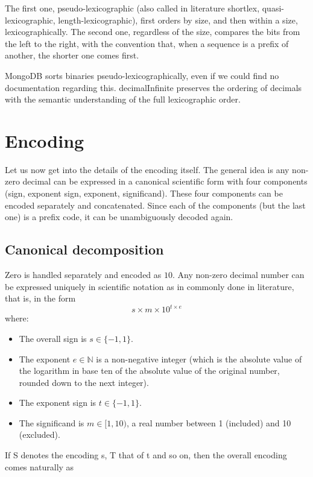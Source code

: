 \documentclass[final,leqno,onefignum,onetabnum]{siamltex1213}
\begin{document}
The first one, pseudo-lexicographic (also called in literature shortlex, quasi-lexicographic, length-lexicographic), first orders by size, and then within a size, lexicographically. The second one, regardless of the size, compares the bits from the left to the right, with the convention that, when a sequence is a prefix of another, the shorter one comes first.




MongoDB sorts binaries pseudo-lexicographically, even if we could find no documentation regarding this. decimalInfinite preserves the ordering of decimals with the semantic understanding of the full lexicographic order.

\section{Encoding}
\label{section-encoding}
Let us now get into the details of the encoding itself. The general idea is any non-zero decimal can be expressed in a canonical scientific form with four components (sign, exponent sign, exponent, significand). These four components can be encoded separately and concatenated. Since each of the components (but the last one) is a prefix code, it can be unambiguously decoded again.

\subsection{Canonical decomposition}

Zero is handled separately and encoded as $10$. Any non-zero decimal number can be expressed uniquely in scientific notation as in commonly done in literature, that is, in the form $$s\times m \times10^{t\times e}$$ where:

\begin{itemize}
\item The overall sign is $s\in \{-1, 1\}$.
\item The exponent $e\in \mathbb{N}$ is a non-negative integer (which is the absolute value of the logarithm in base ten of the absolute value of the original number, rounded down to the next integer).
\item The exponent sign is $t\in \{-1, 1\}$.
\item The significand is $m\in [1,10)$, a real number between 1 (included) and 10 (excluded).
\end{itemize}

If S denotes the encoding s, T that of t and so on, then the overall encoding comes naturally as
\end{document}
